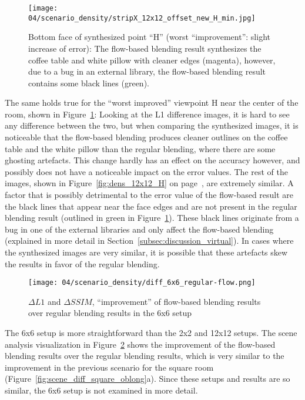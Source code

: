 \begin{figure}
  \centering
  \texttt{[image: 04/scenario\_density/stripX\_12x12\_offset\_new\_H\_min.jpg]}
  \caption[Bottom face of viewpoint ``H'' in the 12x12 setup]{Bottom face of synthesized point ``H'' (worst ``improvement'': slight increase of error): The flow-based blending result synthesizes the coffee table and white pillow with cleaner edges (magenta), however, due to a bug in an external library, the flow-based blending result contains some black lines (green).}
  \label{fig:dens_12x12_H_min}
\end{figure}

The same holds true for the ``worst improved'' viewpoint H near the center of the room, shown in Figure~\ref{fig:dens_12x12_H_min}: Looking at the L1 difference images, it is hard to see any difference between the two, but when comparing the synthesized images, it is noticeable that the flow-based blending produces cleaner outlines on the coffee table and the white pillow than the regular blending, where there are some ghosting artefacts. This change hardly has an effect on the accuracy however, and possibly does not have a noticeable impact on the error values. The rest of the images, shown in Figure~\ref{fig:dens_12x12_H} on page~\pageref{fig:dens_12x12_H}, are extremely similar.
A factor that is possibly detrimental to the error value of the flow-based result are the black lines that appear near the face edges and are not present in the regular blending result (outlined in green in Figure~\ref{fig:dens_12x12_H_min}). These black lines originate from a bug in one of the external libraries and only affect the flow-based blending (explained in more detail in Section~\ref{subsec:discussion_virtual}). In cases where the synthesized images are very similar, it is possible that these artefacts skew the results in favor of the regular blending.

\begin{figure}
		\centering
		\texttt{[image: 04/scenario\_density/diff\_6x6\_regular-flow.png]}
		\caption[$\Delta L1$ and $\Delta SSIM$ in the 6x6 setup]{$\Delta L1$ and $\Delta SSIM$, ``improvement'' of flow-based blending results over regular blending results in the 6x6 setup}
		\label{fig:dens_diff_6x6}
\end{figure}

The 6x6 setup is more straightforward than the 2x2 and 12x12 setups. The scene analysis visualization in Figure~\ref{fig:dens_diff_6x6} shows the improvement of the flow-based blending results over the regular blending results, which is very similar to the improvement in the previous scenario for the square room (Figure~\ref{fig:scene_diff_square_oblong}a). Since these setups and results are so similar, the 6x6 setup is not examined in more detail.

